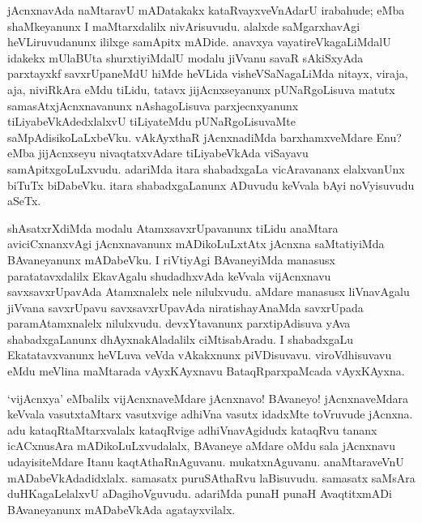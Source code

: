 \begin{artha}
  jAcnxnavAda naMtaravU mADatakakx kataRvayxveVnAdarU irabahude; eMba shaMkeyanunx  I maMtarxdalilx nivArisuvudu. alalxde saMgarxhavAgi heVLiruvudanunx ililxge samApitx mADide. anavxya vayatireVkagaLiMdalU idakekx mUlaBUta shurxtiyiMdalU modalu jiVvanu savaR sAkiSxyAda parxtayxkf savxrUpaneMdU hiMde heVLida visheVSaNagaLiMda nitayx, viraja, aja, niviRkAra eMdu tiLidu, tatavx jijAcnxseyanunx pUNaRgoLisuva matutx samasAtxjAcnxnavanunx nAshagoLisuva parxjecnxyanunx tiLiyabeVkAdedxlalxvU tiLiyateMdu pUNaRgoLisuvaMte saMpAdisikoLaLxbeVku. vAkAyxthaR jAcnxnadiMda barxhamxveMdare Enu? eMba jijAcnxseyu nivaqtatxvAdare tiLiyabeVkAda viSayavu samApitxgoLuLxvudu. adariMda itara shabadxgaLa vicAravananx elalxvanUnx biTuTx biDabeVku. itara shabadxgaLanunx ADuvudu keVvala bAyi noVyisuvudu aSeTx. 
\end{artha}


\begin{artha}
shAsatxrXdiMda modalu AtamxsavxrUpavanunx tiLidu anaMtara aviciCxnanxvAgi jAcnxnavanunx mADikoLuLxtAtx jAcnxna saMtatiyiMda BAvaneyanunx mADabeVku. I riVtiyAgi BAvaneyiMda manasusx paratatavxdalilx EkavAgalu shudadhxvAda keVvala vijAcnxnavu savxsavxrUpavAda Atamxnalelx nele nilulxvudu. aMdare manasusx liVnavAgalu jiVvana savxrUpavu savxsavxrUpavAda niratishayAnaMda savxrUpada paramAtamxnalelx nilulxvudu. devxYtavanunx parxtipAdisuva yAva shabadxgaLanunx dhAyxnakAladalilx ciMtisabAradu. I shabadxgaLu Ekatatavxvanunx heVLuva veVda vAkakxnunx piVDisuvavu. viroVdhisuvavu eMdu meVlina maMtarada vAyxKAyxnavu BataqRparxpaMcada vAyxKAyxna.
\end{artha}


\begin{artha}
`vijAcnxya' eMbalilx vijAcnxnaveMdare jAcnxnavo! BAvaneyo! jAcnxnaveMdara keVvala vasutxtaMtarx vasutxvige adhiVna vasutx idadxMte toVruvude jAcnxna. adu kataqRtaMtarxvalalx kataqRvige adhiVnavAgidudx kataqRvu tananx icACxnusAra mADikoLuLxvudalalx, BAvaneye aMdare oMdu sala jAcnxnavu udayisiteMdare Itanu kaqtAthaRnAguvanu. mukatxnAguvanu. anaMtaraveVnU mADabeVkAdadidxlalx. samasatx puruSAthaRvu laBisuvudu. samasatx saMsAra duHKagaLelalxvU aDagihoVguvudu. adariMda punaH punaH AvaqtitxmADi BAvaneyanunx mADabeVkAda agatayxvilalx.
\end{artha}


